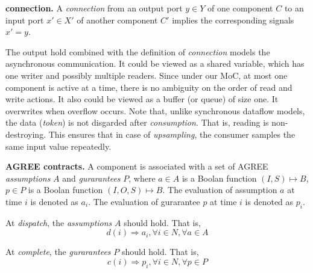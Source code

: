 {\bf connection.}
A \emph{connection} from an output port $y \in Y$ of one component $C$ to an input port $x' \in X'$ of another component $C'$ implies the corresponding signals $x' = y$.



The output hold combined with the definition of \emph{connection} models the asynchronous communication. It could be viewed as a shared variable, which has one writer and possibly multiple readers. Since under our MoC, at most one component is active at a time, there is no ambiguity on the order of read and write actions. It also could be viewed as a buffer (or queue) of size one. It overwrites when overflow occurs. Note that, unlike synchronous dataflow models, the data (\emph{token}) is not disgarded after \emph{consumption}. That is, reading is non-destroying. This ensures that in case of \emph{upsampling}, the consumer samples the same input value repeatedly. 

{\bf AGREE contracts.}
A component is associated with a set of AGREE \emph{assumptions} $A$ and \emph{gurarantees} $P$, where $a \in A$ is a Boolan function $(I, S) \mapsto B$, $p \in P$ is a Boolan function $(I, O, S) \mapsto B$. The evaluation of assumption $a$ at time $i$ is denoted as $a_i$. The evaluation of gurarantee $p$ at time $i$ is denoted as $p_i$. 
	
At \emph{dispatch}, the \emph{assumptions} $A$ should hold. That is,
$$d(i) \Rightarrow a_i, \forall i\in N, \forall a \in A $$

At \emph{complete}, the \emph{gurarantees} $P$ should hold. That is,
$$c(i) \Rightarrow p_i, \forall i\in N, \forall p \in P $$

